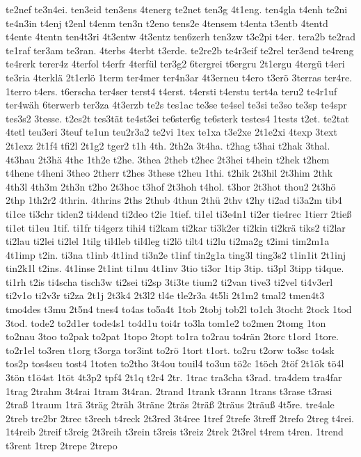 {te2nef
te3n4ei.
ten3eid
ten3ens
4tenerg
te2net
ten3g
4t1eng.
ten4gla
t4enh
te2ni
te4n3in
t4enj
t2enl
t4enm
ten3n
t2eno
tens2e
4tensem
t4enta
t3entb
4tentd
t4ente
4tentn
ten4t3ri
4t3entw
4t3entz
ten6zerh
ten3zw
t3e2pi
t4er.
tera2b
te2rad
te1raf
ter3am
te3ran.
4terbs
4terbt
t3erde.
te2re2b
te4r3eif
te2rel
ter3end
te4reng
te4rerk
terer4z
4terfol
t4erfr
4terfül
ter3g2
6tergrei
t6ergru
2t1ergu
4tergü
t4eri
te3ria
4terklä
2t1erlö
1term
ter4mer
ter4n3ar
4t3erneu
t4ero
t3erö
3terras
ter4re.
1terro
t4ers.
t6erscha
ter4ser
terst4
t4erst.
t4ersti
t4erstu
tert4a
teru2
te4r1uf
ter4wäh
6terwerb
ter3za
4t3erzb
te2s
tes1ac
te3se
te4sel
te3si
te3so
te3sp
te4spr
tes3s2
3tesse.
t2es2t
tes3tät
te4st3ei
te6ster6g
te6sterk
testes4
1tests
t2et.
te2tat
4tetl
teu3eri
3teuf
te1un
teu2r3a2
te2vi
1tex
te1xa
t3e2xe
2t1e2xi
4texp
3text
2t1exz
2t1f4
tfi2l
2t1g2
tger2
t1h
4th.
2th2a
3t4ha.
t2hag
t3hai
t2hak
3thal.
4t3hau
2t3hä
4thc
1th2e
t2he.
3thea
2theb
t2hec
2t3hei
t4hein
t2hek
t2hem
t4hene
t4heni
3theo
2therr
t2hes
3these
t2heu
1thi.
t2hik
2t3hil
2t3him
2thk
4th3l
4th3m
2th3n
t2ho
2t3hoc
t3hof
2t3hoh
t4hol.
t3hor
2t3hot
thou2
2t3hö
2thp
1th2r2
4thrin.
4thrins
2ths
2thub
4thun
2thü
2thv
t2hy
ti2ad
ti3a2m
tib4
ti1ce
ti3chr
tiden2
ti4dend
ti2deo
t2ie
1tief.
ti1el
ti3e4n1
ti2er
tie4rec
1tierr
2tieß
ti1et
ti1eu
1tif.
ti1fr
ti4gerz
tihi4
ti2kam
ti2kar
ti3k2er
ti2kin
ti2krä
tiks2
ti2lar
ti2lau
ti2lei
ti2lel
1tilg
til4leb
til4leg
ti2lö
tilt4
ti2lu
ti2ma2g
t2imi
tim2m1a
4t1imp
t2in.
ti3na
t1inb
4t1ind
ti3n2e
t1inf
tin2g1a
ting3l
ting3s2
t1in1it
2t1inj
tin2k1l
t2ins.
4t1inse
2t1int
ti1nu
4t1inv
3tio
ti3or
1tip
3tip.
ti3pl
3tipp
ti4que.
ti1rh
t2is
ti4scha
tisch3w
ti2sei
ti2sp
3ti3te
tium2
ti2van
tive3
ti2vel
ti4v3erl
ti2v1o
ti2v3r
ti2za
2t1j
2t3k4
2t3l2
tl4e
tle2r3a
4t5li
2t1m2
tmal2
tmen4t3
tmo4des
t3mu
2t5n4
tnes4
to4as
to5a4t
1tob
2tobj
tob2l
to1ch
3tocht
2tock
1tod
3tod.
tode2
to2d1er
tode4s1
to4d1u
toi4r
to3la
tom1e2
to2men
2tomg
1ton
to2nau
3too
to2pak
to2pat
1topo
2topt
to1ra
to2rau
to4rän
2torc
t1ord
1tore.
to2r1el
to3ren
t1org
t3orga
tor3int
to2rö
1tort
t1ort.
to2ru
t2orw
to3sc
to4sk
tos2p
tos4seu
tost4
1toten
to2tho
3t4ou
touil4
to3un
tö2c
1töch
2töf
2t1ök
tö4l
3tön
t1ö4st
1töt
4t3p2
tpf4
2t1q
t2r4
2tr.
1trac
tra3cha
t3rad.
tra4dem
tra4far
1trag
2trahm
3t4rai
1tram
3t4ran.
2trand
1trank
t3rann
1trans
t3rase
t3rasi
2traß
1traum
1trä
3träg
2träh
3träne
2träs
2träß
2träus
2träuß
4t5re.
tre4ale
2treb
tre2br
2trec
t3rech
t4reck
2t3red
3t4ree
1tref
2trefe
3treff
2trefo
2treg
t4rei.
1t4reib
2treif
t3reig
2t3reih
t3rein
t3reis
t3reiz
2trek
2t3rel
t4rem
t4ren.
1trend
t3rent
1trep
2trepe
2trepo
}
